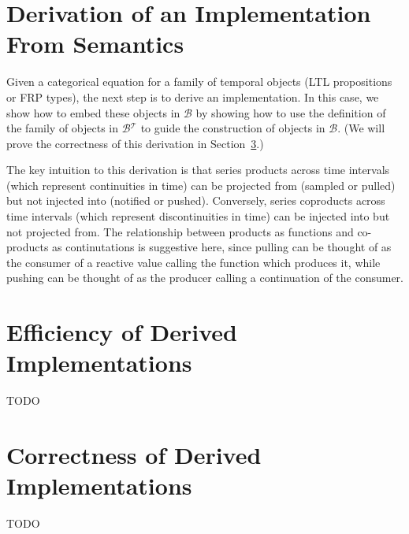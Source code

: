 \documentclass{article}
\newcommand{\lambdacat}[0]{\mathcal{B}}
\newcommand{\timecat}[0]{\mathcal{T}}
\newcommand{\fancat}[0]{\lambdacat{}^\timecat{}}
\begin{document}
\section{Derivation of an Implementation From Semantics}
\label{section:derivation}

Given a categorical equation for a family of temporal objects (LTL propositions or FRP types), the next step is to derive an implementation. In this case, we show how to embed these objects in $\lambdacat{}$ by showing how to use the definition of the family of objects in $\fancat$ to guide the construction of objects in $\lambdacat$. (We will prove the correctness of this derivation in Section~\ref{section:correctness}.)

The key intuition to this derivation is that series products across time intervals (which represent continuities in time) can be projected from (sampled or pulled) but not injected into (notified or pushed). Conversely, series coproducts across time intervals (which represent discontinuities in time) can be injected into but not projected from. The relationship between products as functions and co-products as continutations is suggestive here, since pulling can be thought of as the consumer of a reactive value calling the function which produces it, while pushing can be thought of as the producer calling a continuation of the consumer.

\section{Efficiency of Derived Implementations}
\label{section:efficiency}

TODO

\section{Correctness of Derived Implementations}
\label{section:correctness}

TODO



\end{document}

